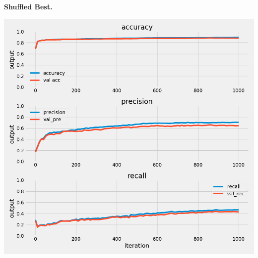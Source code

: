 \documentclass{article}
\begin{document}
\begin{multicols}{2}
	\begin{minipage}[t]{1\columnwidth}
	\begin{center}
	\textbf{Shuffled Best.}\par\medskip
	\includegraphics[width=0.9\columnwidth]{../images/best_with_threshold_class_2_cross_val_4.png}
	\label{shuffled}
	\end{center}
	\end{minipage}


\end{multicols}
\end{document}

